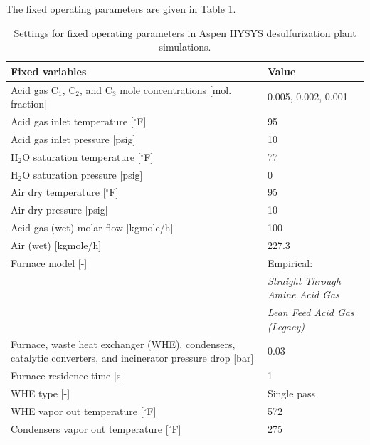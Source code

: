 \documentclass[11pt]{report}
\begin{document}
The fixed operating parameters are given in Table  \ref{tab:Claus_aspen1}. 

\clearpage

\begin{table}
\begin{scriptsize}
\caption{Settings for fixed operating parameters in Aspen HYSYS desulfurization plant simulations.}
\label{tab:Claus_aspen1}
\begin{tabular*}{1\columnwidth}{p{}p{}}
\toprule
Fixed variables & Value\\
\midrule
Acid gas C$_1$, C$_2$, and C$_3$ mole concentrations {[}mol. fraction{]} & 0.005, 0.002, 0.001   \\
Acid gas inlet temperature {[}$^\circ$F{]}                                               & 95       \\
Acid gas inlet pressure {[}psig{]}                                 & 10    \\
H$_2$O saturation temperature {[}$^\circ$F{]}                                                           & 77   \\
H$_2$O saturation pressure {[}psig{]}                                                  & 0  \\
Air dry temperature {[}$^\circ$F{]}                                            & 95    \\
Air dry pressure {[}psig{]}                                  & 10    \\
Acid gas (wet) molar flow {[}kgmole/h{]}                                 & 100   \\
Air (wet) {[}kgmole/h{]}                    & 227.3  \\
Furnace model {[}-{]}                      &     Empirical: \\
						&	     \emph{Straight Through Amine Acid Gas} \\
					          &            \emph{Lean Feed Acid Gas (Legacy)}   \\
Furnace, waste heat exchanger (WHE), condensers, catalytic converters, and incinerator pressure drop {[}bar{]}      &   0.03   \\
Furnace residence time {[}s{]}        &   1\\
WHE type {[}-{]}                              &  Single pass\\
WHE vapor out temperature {[}$^\circ$F{]}  &     572  	  \\ 
Condensers vapor out temperature {[}$^\circ$F{]}         &      275    \\

\end{tabular*}
\end{scriptsize}
\end{table}
\end{document}
